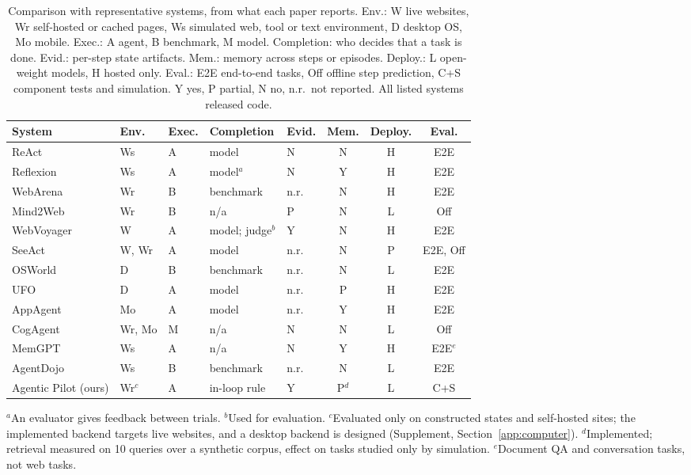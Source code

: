 \begin{table}[t]
\centering
\caption{Comparison with representative systems, from what each paper reports. Env.: W live websites, Wr self-hosted or cached pages, Ws simulated web, tool or text environment, D desktop OS, Mo mobile. Exec.: A agent, B benchmark, M model. Completion: who decides that a task is done. Evid.: per-step state artifacts. Mem.: memory across steps or episodes. Deploy.: L open-weight models, H hosted only. Eval.: E2E end-to-end tasks, Off offline step prediction, C+S component tests and simulation. Y yes, P partial, N no, n.r.\ not reported. All listed systems released code.}
\label{tab:related}
\setlength{\tabcolsep}{1.7pt}
\scriptsize
\begin{tabular}{@{}lllllccc@{}}
\toprule
System & Env. & Exec. & Completion & Evid. & Mem. & Deploy. & Eval. \\
\midrule
ReAct~\cite{yao2023react}               & Ws & A & model & N & N & H & E2E \\
Reflexion~\cite{shinn2023reflexion}     & Ws & A & model$^{a}$ & N & Y & H & E2E \\
WebArena~\cite{zhou2024webarena}        & Wr & B & benchmark & n.r. & N & H & E2E \\
Mind2Web~\cite{deng2023mind2web}        & Wr & B & n/a & P & N & L & Off \\
WebVoyager~\cite{he2024webvoyager}      & W & A & model; judge$^{b}$ & Y & N & H & E2E \\
SeeAct~\cite{zheng2024seeact}           & W, Wr & A & model & n.r. & N & P & E2E, Off \\
OSWorld~\cite{xie2024osworld}           & D & B & benchmark & n.r. & N & L & E2E \\
UFO~\cite{zhang2025ufo}                 & D & A & model & n.r. & P & H & E2E \\
AppAgent~\cite{zhang2025appagent}       & Mo & A & model & n.r. & Y & H & E2E \\
CogAgent~\cite{hong2024cogagent}        & Wr, Mo & M & n/a & N & N & L & Off \\
MemGPT~\cite{packer2023memgpt}          & Ws & A & n/a & N & Y & H & E2E$^{e}$ \\
AgentDojo~\cite{debenedetti2024agentdojo} & Ws & B & benchmark & n.r. & N & L & E2E \\
\midrule
Agentic Pilot (ours)                    & Wr$^{c}$ & A & in-loop rule & Y & P$^{d}$ & L & C+S \\
\bottomrule
\end{tabular}
\vspace{2pt}

\raggedright\scriptsize
$^{a}$An evaluator gives feedback between trials. $^{b}$Used for evaluation. $^{c}$Evaluated only on constructed states and self-hosted sites; the implemented backend targets live websites, and a desktop backend is designed (Supplement, Section~\ref{app:computer}). $^{d}$Implemented; retrieval measured on 10 queries over a synthetic corpus, effect on tasks studied only by simulation. $^{e}$Document QA and conversation tasks, not web tasks.
\end{table}
